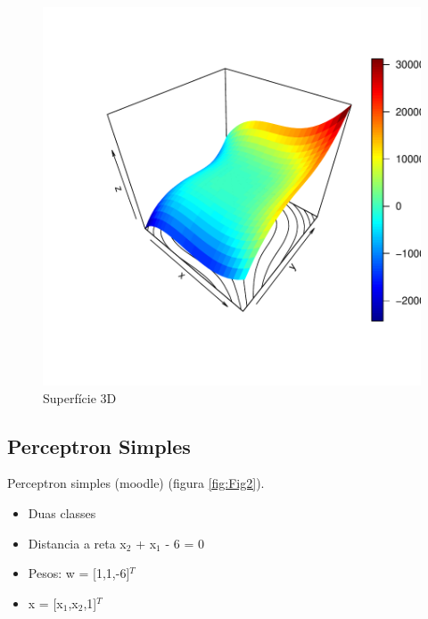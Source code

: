 \documentclass{article}
\begin{document}
\begin{figure}[!htb]
\centering
\includegraphics{1703-002}
\caption{Superfície 3D}
\label{fig:Fig3}
\end{figure}


\subsection{Perceptron Simples}

Perceptron simples (moodle) (figura \ref{fig:Fig2}).

\begin{itemize}
\item Duas classes 
\item Distancia a reta x$_2$ + x$_1$ - 6 = 0
\item Pesos: w = [1,1,-6]$^T$
\item x = [x$_1$,x$_2$,1]$^T$
\end{itemize}
\end{document}

